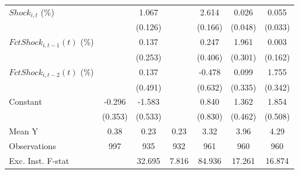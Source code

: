 {\begin{tabular}{l*{6}{c}}
\addlinespace
$ Shock_{i,t}$ (\%) &                     &       1.067\sym{***}&                     &       2.614\sym{***}&       0.026         &       0.055         \\
                    &                     &     (0.126)         &                     &     (0.166)         &     (0.048)         &     (0.033)         \\
\addlinespace
$ FctShock_{i,t-1}(t)$ (\%)&                     &       0.137         &                     &       0.247         &       1.961\sym{***}&       0.003         \\
                    &                     &     (0.253)         &                     &     (0.406)         &     (0.301)         &     (0.162)         \\
\addlinespace
$ FctShock_{i,t-2}(t)$ (\%)&                     &       0.137         &                     &      -0.478         &       0.099         &       1.755\sym{***}\\
                    &                     &     (0.491)         &                     &     (0.632)         &     (0.335)         &     (0.342)         \\
\addlinespace
Constant            &      -0.296         &      -1.583\sym{***}&                     &       0.840         &       1.362\sym{***}&       1.854\sym{***}\\
                    &     (0.353)         &     (0.533)         &                     &     (0.830)         &     (0.462)         &     (0.508)         \\
\midrule
Mean Y              &        0.38         &        0.23         &        0.23         &        3.32         &        3.96         &        4.29         \\
Observations        &         997         &         935         &         932         &         961         &         960         &         960         \\
Exc. Inst. F-stat   &                     &      32.695         &       7.816         &      84.936         &      17.261         &      16.874         \\
\bottomrule
\end{tabular}
}
